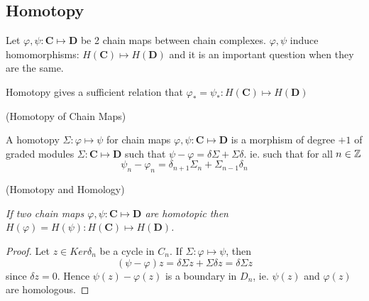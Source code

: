\subsection{Homotopy}\label{df1.2}
\label{df1.2.1}
Let $\varphi,\psi:\textbf{C}\mapsto \textbf{D}$ be 2 chain maps
between chain complexes. $\varphi,\psi$ induce homomorphisms:
$H(\textbf{C})\mapsto H(\textbf{D})$ and it is an important
question when they are the same.

Homotopy gives a sufficient relation that $\varphi_* = \psi_* :
H(\textbf{C})\mapsto H(\textbf{D})$


\begin{definition}(Homotopy of Chain Maps\label{df1.2.2})

A homotopy $\Sigma :\varphi\mapsto \psi$ for chain maps
$\varphi,\psi:\textbf{C}\mapsto \textbf{D}$ is a morphism of
degree $+1$ of graded modules $\Sigma: \textbf{C}\mapsto
\textbf{D}$ such that $\psi-\varphi = \delta\Sigma +\Sigma
\delta$. ie. such that for all $n\in \mathbb Z$
$$\psi_n - \varphi_n = \delta_{n+1} \Sigma_n +
\Sigma_{n-1}\delta_n$$
\end{definition}

\begin{theorem}(Homotopy and Homology\label{df1.2.3})

\emph{If two chain maps $\varphi,\psi:\textbf{C}\mapsto
\textbf{D}$ are homotopic then
$H(\varphi)=H(\psi):H(\textbf{C})\mapsto H(\textbf{D})$.}
\end{theorem}

\begin{proof}
Let $z\in Ker \delta_n$ be a cycle in $C_n$. If $\Sigma
:\varphi\mapsto \psi$, then
$$(\psi-\varphi)z=\delta \Sigma z + \Sigma \delta z = \delta
\Sigma z$$ since $\delta z = 0$. Hence $\psi(z)-\varphi(z)$ is a
boundary in $D_n$, ie. $\psi(z)$ and $\varphi(z)$ are homologous.
\end{proof}








